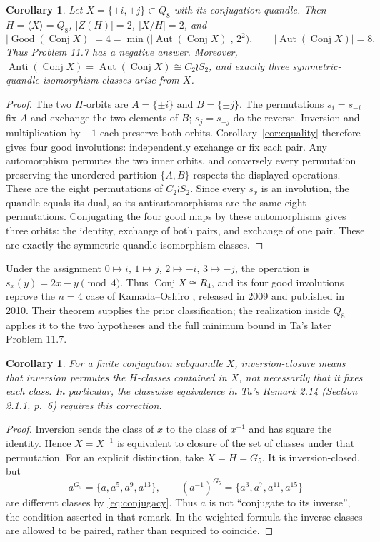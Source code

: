 \documentclass[11pt]{article}
\newtheorem{corollary}[theorem]{Corollary}
\newcommand{\Good}{\operatorname{Good}}
\newcommand{\Conj}{\operatorname{Conj}}
\newcommand{\Aut}{\operatorname{Aut}}
\begin{document}
\begin{corollary}\label{cor:quaternion}
Let $X=\{\pm i,\pm j\}\subset Q_8$ with its conjugation quandle.
Then $H=\langle X\rangle=Q_8$, $|Z(H)|=2$, $|X/H|=2$, and
\[
 |\Good(\Conj X)|=4
 =\min\bigl(|\Aut(\Conj X)|,\,2^2\bigr),
 \qquad |\Aut(\Conj X)|=8.
\]
Thus Problem 11.7 has a negative answer. Moreover,
$\operatorname{Anti}(\Conj X)=\Aut(\Conj X)\cong C_2\wr S_2$,
and exactly three symmetric-quandle isomorphism classes arise from $X$.
\end{corollary}
\begin{proof}
The two $H$-orbits are $A=\{\pm i\}$ and $B=\{\pm j\}$.
The permutations $s_i=s_{-i}$ fix $A$ and exchange the two elements
of $B$; $s_j=s_{-j}$ do the reverse. Inversion and multiplication by
$-1$ each preserve both orbits. Corollary~\ref{cor:equality} therefore
gives four good involutions: independently exchange or fix each pair.
Any automorphism permutes the two inner orbits, and conversely every
permutation preserving the unordered partition $\{A,B\}$ respects
the displayed operations. These are the eight permutations of
$C_2\wr S_2$. Since every $s_x$ is an involution, the quandle equals
its dual, so its antiautomorphisms are the same eight permutations.
Conjugating the four good maps by these automorphisms gives three
orbits: the identity, exchange of both pairs, and exchange of one pair.
These are exactly the symmetric-quandle isomorphism classes.
\end{proof}

Under the assignment $0\mapsto i$, $1\mapsto j$, $2\mapsto-i$,
$3\mapsto-j$, the operation is $s_x(y)=2x-y\pmod4$.
Thus $\Conj X\cong R_4$, and its four good involutions reprove the
$n=4$ case of Kamada--Oshiro \cite[Theorem 3.2(3)]{KO}, released
in 2009 and published in 2010. Their theorem supplies the prior
classification; the realization inside $Q_8$ applies it to the two
hypotheses and the full minimum bound in Ta's later Problem 11.7.

\begin{corollary}\label{cor:inverse}
For a finite conjugation subquandle $X$, inversion-closure means that
inversion permutes the $H$-classes contained in $X$, not necessarily
that it fixes each class. In particular, the classwise equivalence
in Ta's Remark 2.14 (Section 2.1.1, p.~6) requires this correction.
\end{corollary}
\begin{proof}
Inversion sends the class of $x$ to the class of $x^{-1}$ and has
square the identity. Hence $X=X^{-1}$ is equivalent to closure of
the set of classes under that permutation. For an explicit distinction,
take $X=H=G_5$. It is inversion-closed, but
\[
 a^{G_5}=\{a,a^5,a^9,a^{13}\},\qquad
 (a^{-1})^{G_5}=\{a^3,a^7,a^{11},a^{15}\}
\]
are different classes by \eqref{eq:conjugacy}.
Thus $a$ is not ``conjugate to its inverse'', the condition asserted
in that remark. In the weighted formula the inverse classes are
allowed to be paired, rather than required to coincide.
\end{proof}
\end{document}
